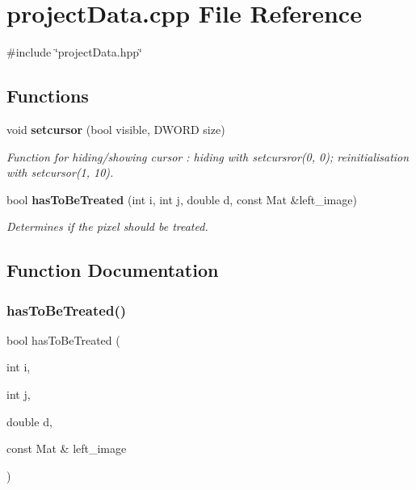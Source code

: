 \section{project\+Data.\+cpp File Reference}
\label{project_data_8cpp}
{\ttfamily \#include \char`\"{}project\+Data.\+hpp\char`\"{}}\newline
\subsection*{Functions}
\begin{DoxyCompactItemize}
\item 
void \textbf{ setcursor} (bool visible, D\+W\+O\+RD size)
\begin{DoxyCompactList}\small\item\em Function for hiding/showing cursor \+: hiding with setcursror(0, 0); reinitialisation with setcursor(1, 10). \end{DoxyCompactList}\item 
bool \textbf{ has\+To\+Be\+Treated} (int i, int j, double d, const Mat \&left\+\_\+image)
\begin{DoxyCompactList}\small\item\em Determines if the pixel should be treated. \end{DoxyCompactList}\end{DoxyCompactItemize}


\subsection{Function Documentation}
\mbox{\label{project_data_8cpp_a51661db0d98d3b889acb2cc3aab03837}} 
\subsubsection{has\+To\+Be\+Treated()}
{\footnotesize\ttfamily bool has\+To\+Be\+Treated (\begin{DoxyParamCaption}\item[{int}]{i,  }\item[{int}]{j,  }\item[{double}]{d,  }\item[{const Mat \&}]{left\+\_\+image }\end{DoxyParamCaption})\hspace{0.3cm}{\ttfamily [inline]}}



